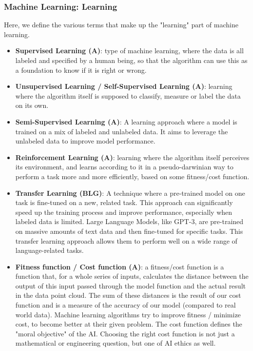 \documentclass{article}
\begin{document}
\subsubsection*{Machine Learning: Learning}

Here, we define the various terms that make up the "learning" part of machine learning.

\begin{itemize}

	\item \textbf{Supervised Learning (A)}: type of machine learning, where the data is all labeled and specified by a human being, so that the algorithm can use this as a foundation to know if it is right or wrong.

	\item \textbf{Unsupervised Learning / Self-Supervised Learning (A)}: learning where the algorithm itself is supposed to classify, measure or label the data on its own.

	\item \textbf{Semi-Supervised Learning (A)}: A learning approach where a model is trained on a mix of labeled and unlabeled data. It aims to leverage the unlabeled data to improve model performance.

	\item \textbf{Reinforcement Learning (A)}: learning where the algorithm itself perceives its environment, and learns according to it in a pseudo-darwinian way to perform a task more and more efficiently, based on some fitness/cost function.

	\item \textbf{Transfer Learning (BLG)}: A technique where a pre-trained model on one task is fine-tuned on a new, related task. This approach can significantly speed up the training process and improve performance, especially when labeled data is limited. Large Language Models, like GPT-3, are pre-trained on massive amounts of text data and then fine-tuned for specific tasks. This transfer learning approach allows them to perform well on a wide range of language-related tasks.

	\item \textbf{Fitness function / Cost function (A)}: a fitness/cost function is a function that, for a whole series of inputs, calculates the distance between the output of this input passed through the model function and the actual result in the data point cloud. The sum of these distances is the result of our cost function and is a measure of the accuracy of our model (compared to real world data). Machine learning algorithms try to improve fitness / minimize cost, to become better at their given problem. The cost function defines the "moral objective" of the AI. Choosing the right cost function is not just a mathematical or engineering question, but one of AI ethics as well.


\end{itemize}
\end{document}
